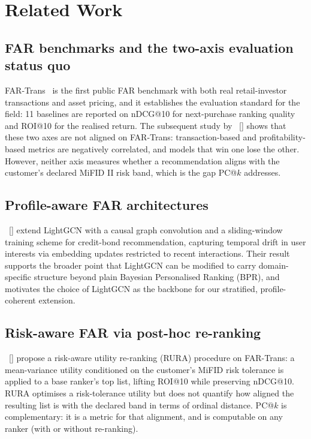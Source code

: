 \section{Related Work}
\label{sec:relatedwork}

\subsection{FAR benchmarks and the two-axis evaluation status quo}
FAR-Trans~\cite{sanzcruzado2024fartransinvestmentdatasetfinancial} is the first public FAR benchmark with both real retail-investor transactions and asset pricing, and it establishes the evaluation standard for the field: 11 baselines are reported on nDCG@10 for next-purchase ranking quality and ROI@10 for the realised return. The subsequent study by \citeauthor{10.1145/3780097}~[\citeyear{10.1145/3780097}] shows that these two axes are not aligned on FAR-Trans: transaction-based and profitability-based metrics are negatively correlated, and models that win one lose the other. However, neither axis measures whether a recommendation aligns with the customer's declared MiFID II risk band, which is the gap PC@$k$ addresses.

\subsection{Profile-aware FAR architectures}
\citeauthor{Ghiye_2024}~[\citeyear{Ghiye_2024}] extend LightGCN with a causal graph convolution and a sliding-window training scheme for credit-bond recommendation, capturing temporal drift in user interests via embedding updates restricted to recent interactions. Their result supports the broader point that LightGCN can be modified to carry domain-specific structure beyond plain Bayesian Personalised Ranking (BPR), and motivates the choice of LightGCN as the backbone for our stratified, profile-coherent extension.

\subsection{Risk-aware FAR via post-hoc re-ranking}
\citeauthor{10.1145/3773966.3779383}~[\citeyear{10.1145/3773966.3779383}] propose a risk-aware utility re-ranking (RURA) procedure on FAR-Trans: a mean-variance utility conditioned on the customer's MiFID risk tolerance is applied to a base ranker's top list, lifting ROI@10 while preserving nDCG@10. RURA optimises a risk-tolerance utility but does not quantify how aligned the resulting list is with the declared band in terms of ordinal distance. PC@$k$ is complementary: it is a metric for that alignment, and is computable on any ranker (with or without re-ranking).


